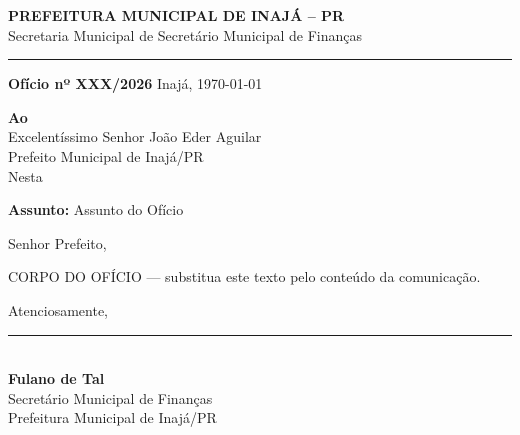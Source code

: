 \documentclass[12pt,a4paper]{article}
\newcommand{\municipio}{Inajá}
\newcommand{\uf}{PR}
\newcommand{\prefeitoAtual}{João Eder Aguilar}
\newcommand{\numeroOfício}{XXX/2026}
\newcommand{\localData}{\municipio, \today}
\newcommand{\destinatarioNome}{Excelentíssimo Senhor \prefeitoAtual}
\newcommand{\destinatarioCargo}{Prefeito Municipal de \municipio/\uf}
\newcommand{\assuntoOfício}{Assunto do Ofício}
\newcommand{\remetenteNome}{Fulano de Tal}
\newcommand{\remetenteCargo}{Secretário Municipal de Finanças}
\begin{document}

\begin{center}
  {\large\textbf{PREFEITURA MUNICIPAL DE \MakeUppercase{\municipio} -- \uf}}\\[2pt]
  {\small Secretaria Municipal de \remetenteCargo}\\[2pt]
  \rule{\textwidth}{0.4pt}
\end{center}

\vspace{0.5cm}

\textbf{Ofício nº \numeroOfício} \hfill \localData

\vspace{0.8cm}

\begin{flushleft}
  \textbf{Ao}\\
  \destinatarioNome\\
  \destinatarioCargo\\
  Nesta
\end{flushleft}

\vspace{0.8cm}

\textbf{Assunto:} \assuntoOfício

\vspace{0.5cm}

Senhor Prefeito,

\vspace{0.3cm}

CORPO DO OFÍCIO — substitua este texto pelo conteúdo da comunicação.

\vspace{0.3cm}

Atenciosamente,

\vspace{1.2cm}

\rule{5cm}{0.4pt}\\
\textbf{\remetenteNome}\\
\remetenteCargo\\
Prefeitura Municipal de \municipio/\uf
\end{document}
